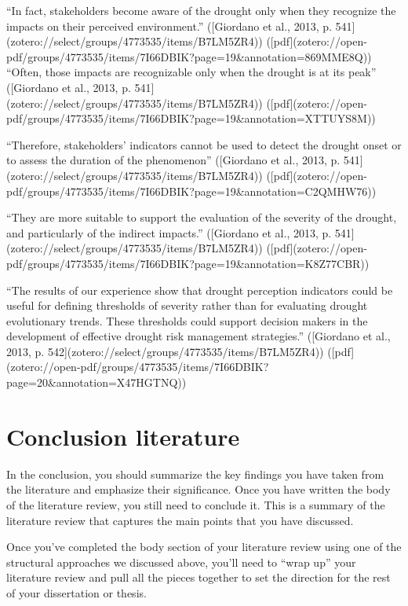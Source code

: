 {“In fact, stakeholders become aware of the drought only when they recognize the impacts on their perceived environment.” ([Giordano et al., 2013, p. 541](zotero://select/groups/4773535/items/B7LM5ZR4)) ([pdf](zotero://open-pdf/groups/4773535/items/7I66DBIK?page=19&annotation=869MME8Q))
“Often, those impacts are recognizable only when the drought is at its peak” ([Giordano et al., 2013, p. 541](zotero://select/groups/4773535/items/B7LM5ZR4)) ([pdf](zotero://open-pdf/groups/4773535/items/7I66DBIK?page=19&annotation=XTTUYS8M))

“Therefore, stakeholders’ indicators cannot be used to detect the drought onset or to assess the duration of the phenomenon” ([Giordano et al., 2013, p. 541](zotero://select/groups/4773535/items/B7LM5ZR4)) ([pdf](zotero://open-pdf/groups/4773535/items/7I66DBIK?page=19&annotation=C2QMHW76))

“They are more suitable to support the evaluation of the severity of the drought, and particularly of the indirect impacts.” ([Giordano et al., 2013, p. 541](zotero://select/groups/4773535/items/B7LM5ZR4)) ([pdf](zotero://open-pdf/groups/4773535/items/7I66DBIK?page=19&annotation=K8Z77CBR))

“The results of our experience show that drought perception indicators could be useful for defining thresholds of severity rather than for evaluating drought evolutionary trends. These thresholds could support decision makers in the development of effective drought risk management strategies.” ([Giordano et al., 2013, p. 542](zotero://select/groups/4773535/items/B7LM5ZR4)) ([pdf](zotero://open-pdf/groups/4773535/items/7I66DBIK?page=20&annotation=X47HGTNQ))


\section{Conclusion literature}
In the conclusion, you should summarize the key findings you have taken from the literature and emphasize their significance.
Once you have written the body of the literature review, you still need to conclude it. This is a summary of the literature review that captures the main points that you have discussed.

Once you’ve completed the body section of your literature review using one of the structural approaches we discussed above, you’ll need to “wrap up” your literature review and pull all the pieces together to set the direction for the rest of your dissertation or thesis.

}
